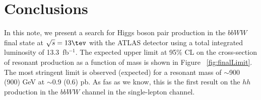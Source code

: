 \section{Conclusions}
\label{sec:dihiggs_conclusions}

In this note, we present a search for Higgs boson pair production in the
$bbWW$ final state at $\sqrt{s} = 13 \tev$ with the ATLAS detector using
a total integrated luminosity of 13.3~fb$^{-1}$.
The expected upper limit at 95\% CL on the cross-section of
resonant production as a function of mass is shown in
Figure ~\ref{fig:finalLimit}. 
The most stringent limit is observed (expected) for a resonant mass of
$\sim$900 (900) GeV at $\sim$0.9 (0.6) pb. As fas as we know, this is the first result on the $hh$ production in the $bbWW$ channel in the single-lepton channel. 

\clearpage
